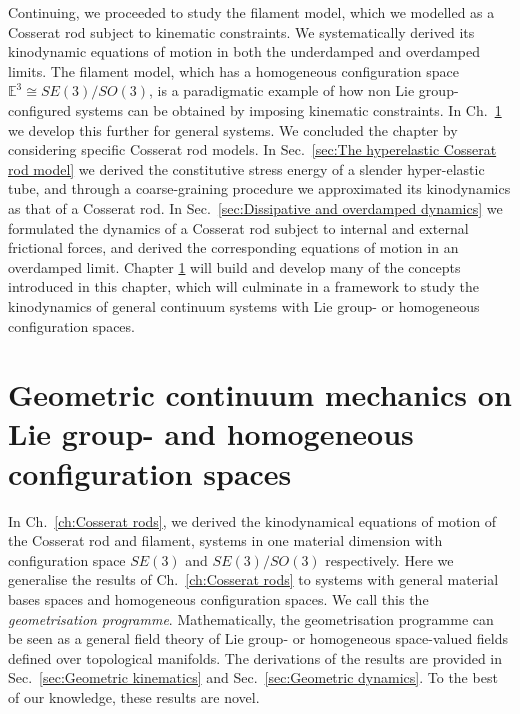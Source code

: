 Continuing, we proceeded to study the filament model, which we modelled as a Cosserat rod subject to kinematic constraints. We systematically derived its kinodynamic equations of motion in both the underdamped and overdamped limits. The filament model, which has a homogeneous configuration space $\mathbb{E}^3 \cong SE(3)/SO(3)$, is a paradigmatic example of how non Lie group-configured systems can be obtained by imposing kinematic constraints. In Ch.~\ref{ch:Geometric continuum mechanics on homogeneous configuration spaces} we develop this further for general systems. We concluded the chapter by considering specific Cosserat rod models. In Sec.~\ref{sec:The hyperelastic Cosserat rod model} we derived the constitutive stress energy of a slender hyper-elastic tube, and through a coarse-graining procedure we approximated its kinodynamics as that of a Cosserat rod. In Sec.~\ref{sec:Dissipative and overdamped dynamics} we formulated the dynamics of a Cosserat rod subject to internal and external frictional forces, and derived the corresponding equations of motion in an overdamped limit. Chapter \ref{ch:Geometric continuum mechanics on homogeneous configuration spaces} will build and develop many of the concepts introduced in this chapter, which will culminate in a framework to study the kinodynamics of general continuum systems with Lie group- or homogeneous configuration spaces. 

\chapter{Geometric continuum mechanics on Lie group- and homogeneous configuration spaces} \label{ch:Geometric continuum mechanics on homogeneous configuration spaces}

In Ch.~\ref{ch:Cosserat rods}, we derived the kinodynamical equations of motion of the Cosserat rod and filament, systems in one material dimension with configuration space $SE(3)$ and $SE(3)/SO(3)$ respectively. Here we generalise the results of Ch.~\ref{ch:Cosserat rods} to systems with general material bases spaces and homogeneous configuration spaces. We call this the \textit{geometrisation programme}. Mathematically, the geometrisation programme can be seen as a general field theory of Lie group- or homogeneous space-valued fields defined over topological manifolds. The derivations of the results are provided in Sec.~\ref{sec:Geometric kinematics} and Sec.~\ref{sec:Geometric dynamics}. To the best of our knowledge, these results are novel.

